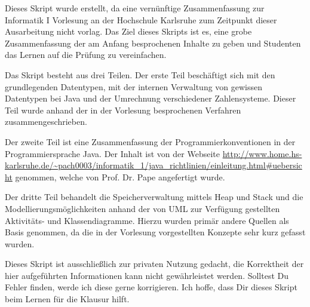 
\begin{declaration}

Dieses Skript wurde erstellt, da eine vernünftige Zusammenfassung zur Informatik I Vorlesung an der Hochschule Karlsruhe zum Zeitpunkt dieser Ausarbeitung nicht vorlag. Das Ziel dieses Skripts ist es, eine grobe Zusammenfassung der am Anfang besprochenen Inhalte zu geben und Studenten das Lernen auf die Prüfung zu vereinfachen. 

Das Skript besteht aus drei Teilen. Der erste Teil beschäftigt sich mit den grundlegenden Datentypen, mit der internen Verwaltung von gewissen Datentypen bei Java und der Umrechnung verschiedener Zahlensysteme. Dieser Teil wurde anhand der in der Vorlesung besprochenen Verfahren zusammengeschrieben.

Der zweite Teil ist eine Zusammenfassung der Programmierkonventionen in der Programmiersprache Java. Der Inhalt ist von der Webseite \url{http://www.home.hs-karlsruhe.de/~pach0003/informatik_1/java_richtlinien/einleitung.html#uebersicht} genommen, welche von Prof. Dr. Pape angefertigt wurde. 

Der dritte Teil behandelt die Speicherverwaltung mittels Heap und Stack und die Modellierungsmöglichkeiten anhand der von UML zur Verfügung gestellten Aktivitäts- und Klassendiagramme. Hierzu wurden primär andere Quellen als Basis genommen, da die in der Vorlesung vorgestellten Konzepte sehr kurz gefasst wurden.

Dieses Skript ist ausschließlich zur privaten Nutzung gedacht, die Korrektheit der hier aufgeführten Informationen kann nicht gewährleistet werden. Solltest Du Fehler finden, werde ich diese gerne korrigieren.
Ich hoffe, dass Dir dieses Skript beim Lernen für die Klausur hilft.

\end{declaration}

